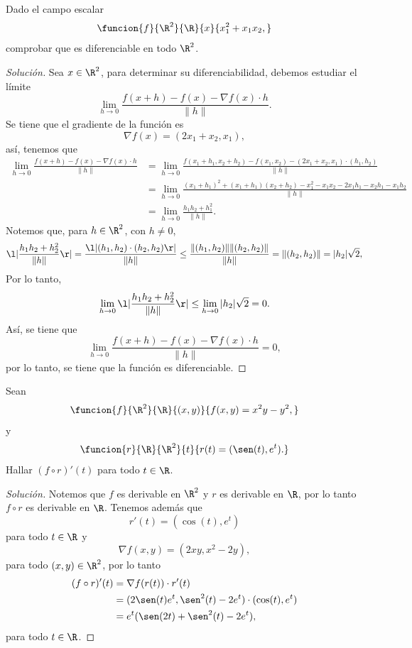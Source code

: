\documentclass[a4,11pt]{aleph-notas}
\begin{document}
\begin{ejer}
Dado el campo escalar
    \[
        \funcion{f}{\R^2}{\R}{x}{x_1^2+x_1x_2,}
    \]
    comprobar que es diferenciable en todo $\R^2$.
\end{ejer}

\begin{proof}[Solución]
Sea $x\in\R^2$, para determinar su diferenciabilidad, debemos estudiar el límite
    \[
        \lim_{h\to 0}\frac{f(x+h)-f(x)-\nabla f(x)\cdot h}{\|h\|}.
    \]
    Se tiene que el gradiente de la función es
    \[
        \nabla f(x) = (2x_1+x_2,x_1),
    \]
    así, tenemos que
    \begin{align*}
        \lim_{h\to 0}\frac{f(x+h)-f(x)-\nabla f(x)\cdot h}{\|h\|}
            & =  \lim_{h\to 0}\frac{f(x_1+h_1,x_2+h_2)-f(x_1,x_2) - (2x_1+x_2,x_1)\cdot(h_1,h_2)}{\|h\|}\\
            & =  \lim_{h\to 0}\frac{(x_1+h_1)^2+(x_1+h_1)(x_2+h_2)-x_1^2-x_1x_2 - 2x_1h_1-x_2h_1-x_1h_2}{\|h\|}\\
            & =  \lim_{h\to 0}\frac{h_1h_2+h_1^2}{\|h\|}.
    \end{align*}
    Notemos que, para $h\in\R^2$, con $h\neq 0$,
    \[
        \l|\frac{h_1h_2+h_2^2}{\|h\|}\r| 
        = \frac{\l|(h_1,h_2)\cdot(h_2,h_2)\r|}{\|h\|}
        \leq \frac{\|(h_1,h_2)\|\|(h_2,h_2)\|}{\|h\|}
        =\|(h_2,h_2)\|=|h_2|\sqrt{2},
    \]
    Por lo tanto,
    \[
        \lim_{h\to 0}\l|\frac{h_1h_2+h_2^2}{\|h\|}\r|\leq \lim_{h\to 0}|h_2|\sqrt{2}  =0.
    \]
    Así, se tiene que
    \[
        \lim_{h\to 0}\frac{f(x+h)-f(x)-\nabla f(x)\cdot h}{\|h\|}=0,
    \]
    por lo tanto, se tiene que la función es diferenciable.
\end{proof}

\begin{ejer}
Sean 
	\[
        \funcion{f}{\R^2}{\R}
        {(x,y)}{f(x,y) = x^2 y - y^2,}
	\]
    y 
    \[
        \funcion{r}{\R}{\R^2}
        {t}{r(t) = (\sen(t), e^t).}
	\]
    Hallar $(f \circ r)'(t)$ para todo $t\in\R$.
\end{ejer}

\begin{proof}[Solución]
Notemos que $f$ es derivable en $\R^2$ y $r$ es derivable en $\R$, por lo tanto $f\circ r$ es derivable en $\R$. Tenemos además que
    \[
        r'(t)=(\cos(t), e^t)
    \]
    para todo $t\in\R$ y
    \[
        \nabla f(x,y) = (2xy, x^2 - 2y),
    \]
    para todo $(x,y)\in\R^2$, por lo tanto
    \begin{align*}
        (f \circ r)'(t) 
            &= \nabla f(r(t)) \cdot r'(t)\\
    		&= (2\sen(t) e^t, \sen^2(t) - 2e^t)\cdot (\cos(t), e^t)\\
            &= e^t(\sen(2t) + \sen^2(t) - 2e^t),
    \end{align*}
    para todo $t\in\R$.
\end{proof}
\end{document}
